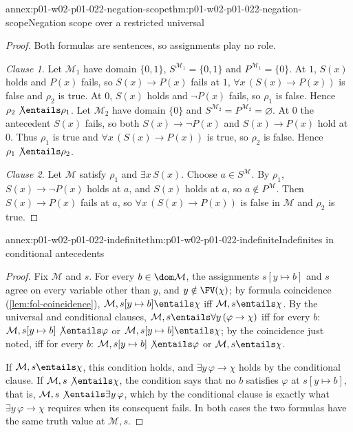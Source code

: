 \begin{annexitem}{annex:p01-w02-p01-022-negation-scope}{thm:p01-w02-p01-022-negation-scope}{Negation scope over a restricted universal}
\begin{proof}
Both formulas are sentences, so assignments play no role.

\emph{Clause 1.} Let \(\mathcal M_1\) have domain \(\{0,1\}\),
\(S^{\mathcal M_1}=\{0,1\}\) and \(P^{\mathcal M_1}=\{0\}\). At \(1\),
\(S(x)\) holds and \(P(x)\) fails, so \(S(x)\to P(x)\) fails at \(1\),
\(\forall x\,(S(x)\to P(x))\) is false and \(\rho_2\) is true. At \(0\),
\(S(x)\) holds and \(\neg P(x)\) fails, so \(\rho_1\) is false. Hence
\(\rho_2\not\entails\rho_1\). Let \(\mathcal M_2\) have domain \(\{0\}\) and
\(S^{\mathcal M_2}=P^{\mathcal M_2}=\varnothing\). At \(0\) the antecedent
\(S(x)\) fails, so both \(S(x)\to\neg P(x)\) and \(S(x)\to P(x)\) hold at
\(0\). Thus \(\rho_1\) is true and \(\forall x\,(S(x)\to P(x))\) is true, so
\(\rho_2\) is false. Hence \(\rho_1\not\entails\rho_2\).

\emph{Clause 2.} Let \(\mathcal M\) satisfy \(\rho_1\) and
\(\exists x\,S(x)\). Choose \(a\in S^{\mathcal M}\). By \(\rho_1\),
\(S(x)\to\neg P(x)\) holds at \(a\), and \(S(x)\) holds at \(a\), so
\(a\notin P^{\mathcal M}\). Then \(S(x)\to P(x)\) fails at \(a\), so
\(\forall x\,(S(x)\to P(x))\) is false in \(\mathcal M\) and \(\rho_2\) is
true.
\end{proof}
\end{annexitem}

\begin{annexitem}{annex:p01-w02-p01-022-indefinite}{thm:p01-w02-p01-022-indefinite}{Indefinites in conditional antecedents}
\begin{proof}
Fix \(\mathcal M\) and \(s\). For every \(b\in\dom\mathcal M\), the
assignments \(s[y\mapsto b]\) and \(s\) agree on every variable other than
\(y\), and \(y\notin\FV(\chi)\); by formula coincidence
(\cref{lem:fol-coincidence}),
\(\mathcal M,s[y\mapsto b]\entails\chi\) iff \(\mathcal M,s\entails\chi\).
By the universal and conditional clauses,
\(\mathcal M,s\entails\forall y\,(\varphi\to\chi)\) iff for every \(b\):
\(\mathcal M,s[y\mapsto b]\not\entails\varphi\) or
\(\mathcal M,s[y\mapsto b]\entails\chi\); by the coincidence just noted,
iff for every \(b\): \(\mathcal M,s[y\mapsto b]\not\entails\varphi\) or
\(\mathcal M,s\entails\chi\).

If \(\mathcal M,s\entails\chi\), this condition holds, and
\(\exists y\,\varphi\to\chi\) holds by the conditional clause. If
\(\mathcal M,s\not\entails\chi\), the condition says that no \(b\)
satisfies \(\varphi\) at \(s[y\mapsto b]\), that is,
\(\mathcal M,s\not\entails\exists y\,\varphi\), which by the conditional
clause is exactly what \(\exists y\,\varphi\to\chi\) requires when its
consequent fails. In both cases the two formulas have the same truth value
at \(\mathcal M,s\).
\end{proof}
\end{annexitem}

